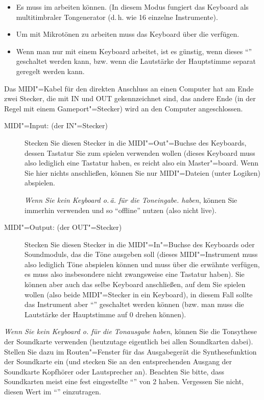 \begin{itemize}
\item Es muss im  arbeiten können.
  (In diesem Modus fungiert das Keyboard als multitimbraler
  Tongenerator (d.\,h. wie 16 einzelne Instrumente).
\item Um mit Mikrotönen zu arbeiten muss das Keyboard über die
   verfügen.
\item Wenn man nur mit einem Keyboard arbeitet, ist es günstig, wenn
  dieses "`"' geschaltet werden kann, bzw.
  wenn die Lautstärke der Hauptstimme separat geregelt werden kann.
\end{itemize}

Das MIDI"=Kabel für den direkten Anschluss an einen Computer hat am
Ende zwei Stecker, die mit IN und OUT gekennzeichnet sind, das andere
Ende (in der Regel mit einem Gameport"=Stecker) wird an den Computer
angeschlossen.

\begin{description}
\item[MIDI"=Input: (der IN"=Stecker)] Stecken Sie diesen Stecker in
  die MIDI"=Out"=Buchse des Keyboards, dessen Tastatur Sie zum spielen
  verwenden wollen (dieses Keyboard muss also lediglich eine Tastatur
  haben, es reicht also ein Master"=board. Wenn Sie hier nichts
  anschließen, können Sie nur MIDI"=Dateien (unter Logiken) abspielen.

  \emph{Wenn Sie kein Keyboard o.\,ä. für die Toneingabe.  haben},
  können Sie immerhin  verwenden und so \mutabor{} "`offline"' nutzen (also
  nicht live).
\item[MIDI"=Output: (der OUT"=Stecker)] Stecken Sie diesen Stecker in
  die MIDI"=In"=Buchse des Keyboards oder Soundmoduls, das die Töne
  ausgeben soll (dieses MIDI"=Instrument muss also lediglich Töne
  abspielen können und muss über die erwähnte
   verfügen, es muss also
  insbesondere nicht zwangsweise eine Tastatur haben). Sie können aber
  auch das selbe Keyboard anschließen, auf dem Sie spielen wollen
  (also beide MIDI"=Stecker in ein Keyboard), in diesem Fall sollte
  das Instrument aber "`"' geschaltet
  werden können (bzw. man muss die Lautstärke der Hauptstimme auf 0
  drehen können).
\end{description}


\emph{Wenn Sie kein Keyboard o. für die Tonausgabe haben}, können Sie
die Tonsythese der Soundkarte verwenden (heutzutage eigentlich bei
allen Soundkarten dabei). Stellen Sie dazu im Routen"=Fenster für das
Ausgabegerät die Synthesefunktion der Soundkarte ein (und stecken Sie
an den entsprechenden Ausgang der Soundkarte Kopfhörer oder
Lautsprecher an). Beachten Sie bitte, dass Soundkarten meist eine fest
eingestellte "`"' von 2
haben. Vergessen Sie nicht, diesen Wert im
"`"' einzutragen.

